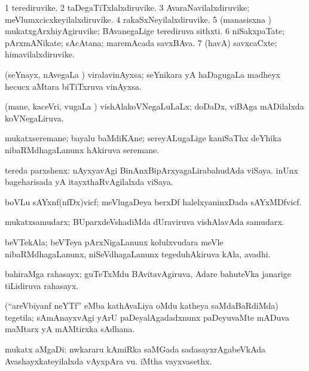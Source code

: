 \bentry
{}
\gl{\nA}
\bmng
\bnum
\num{1} terediruvike. 
\num{2} taDegaTiTxlalxdiruvike. 
\num{3} AvaraNavilalxdiruvike; meVlumxcicxkeyilalxdiruvike. 
\num{4} rakaSxNeyilalxdiruvike. 
\num{5} (manasisxna \vi) mukatxgArxhiyAgiruvike; BAvanegaLige terediruva sithxti. 
\num{6} niSakxpaTate; pArxmANikate; sAcAtana; maremAcada savxBAva. 
\num{7} (havA) savxcaCxte; himavilalxdiruvike. 
\enum
\emng
\eentry

\bentry
{}
\gl{\nA}
\bmng
(seYnayx, nAvegaLa \vi) viralavinAyxsa; seYnikara yA haDagugaLa madheyx hecucx aMtara biTiTxruva vinAyxsa. 
\emng
\eentry

\bentry
{}
\gl{\gu}
\bmng
(mane, kaceVri, \mo vugaLa \vi) vishAlakoVNegaLuLaLx; doDaDx, viBAga mADilalxda koVNegaLiruva. 
\emng
\eentry

\bentry
{}
\gl{\nA}
\bmng
mukatxseremane; bayalu baMdiKAne; sereyALugaLige kaniSaThx deYhika nibaRMdhagaLanunx hAkiruva seremane. 
\emng
\eentry

\bentry
{}
\gl{\nA}
\bmng
tereda parxshenx: 
\banum
{} nAyxyavAgi BinAnxBipArxyagaLirabahudAda viSaya. 
 inUnx bageharisada yA itayxthaRvAgilalxda viSaya. 
\eanum
\emng
\eentry

\bentry
{}
\gl{\nA}
\bmng
boVLu sAYxnf(nfDx)vicf; meVlugaDeya berxDf halelxyaninxDada sAYxMDfvicf. 
\emng
\eentry

\bentry
{}
\gl{\nA}
\bmng
mukatxsamudarx; BUparxdeVshadiMda dUraviruva vishAlavAda samudarx. 
\emng
\eentry

\bentry
{}
\gl{\nA}
\bmng
beVTekAla; beVTeya pArxNigaLanunx kolulxvudara meVle nibaRMdhagaLanunx, niSeVdhagaLanunx tegeduhAkiruva kAla, avadhi. 
\emng
\eentry

\bentry
{}
\gl{\nA}
\bmng
bahiraMga rahasayx; guTeTxMdu BAvitavAgiruva, Adare bahuteVka janarige tiLidiruva rahasayx. 
\emng
\eentry

\bentry
{}
\gl{\nA}
\bmng
(``areVbiyanf neYTf'' eMba kathAvaLiya oMdu katheya saMdaBaRdiMda) tegetila; sAmAnayxvAgi yArU paDeyalAgadadxnunx paDeyuvaMte mADuva maMtarx yA mAMtirxka sAdhana. 
\emng
\eentry

\bentry
{}
\gl{\nA}
\bmng
mukatx aMgaDi: 
\banum
{} nwkararu kAmiRka saMGada sadasayxrAgabeVkAda Avashayxkateyilalxda vAyxpAra \mo vu. 
 iMtha vayxvasethx. 
\eanum
\emng
\eentry

